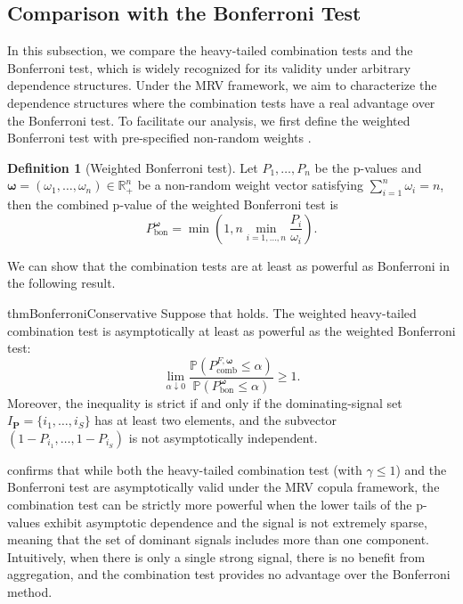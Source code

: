 \documentclass[12pt]{article}
\theoremstyle{plain}
\theoremstyle{plain}
\theoremstyle{definition}
\newtheorem{defn}{Definition}[section]
\renewcommand{\Pr}{\mathbb{P}}
\begin{document}
\subsection{Comparison with the Bonferroni Test}
\label{subsec:comp-with-bonferroni}
In this subsection, we compare the heavy-tailed combination tests
and the Bonferroni test, which is widely recognized for its validity under arbitrary dependence structures. 
Under the MRV framework, we aim to characterize the dependence structures where the combination tests have a real advantage over the Bonferroni test.  
To facilitate our analysis, we first define the weighted Bonferroni test with pre-specified non-random weights \citep{genovese2006false}.
\begin{defn}[Weighted Bonferroni test]
\label{def:bonferroni-test}
Let $P_1,\dots,P_n$ be the p-values and $\bm{\omega}=\left(\omega_1,\dots,\omega_n\right) \in\mathbb{R}_+^n$ be a non-random weight vector satisfying $\sum_{i = 1}^n \omega_i = n$, then the combined p-value of the weighted Bonferroni test is
$$P_{\mathrm{bon}}^{\bm{\omega}} =\min \left(1, n\min_{i=1,\dots,n}\frac{P_i}{\omega_i}\right).$$
\end{defn}






We can show that the combination tests are at least as powerful as Bonferroni in the following result.
\begin{restatable}{thm}{BonferroniConservative}
\label{thm:bonferroni-more-conservative}
Suppose that  holds.
The weighted heavy-tailed combination test is asymptotically at least as powerful as the weighted Bonferroni test:
\begin{equation*}
\lim_{\alpha\downarrow0}\frac{\Pr\left(P_\mathrm{comb}^{F, \bm \omega}\leq \alpha\right)}{\Pr\left(P_{\mathrm{bon}}^{\bm{\omega}}\leq \alpha\right)}\ge1.
\end{equation*}
Moreover, the inequality is strict if and only if the dominating-signal set $I_{\mathbf P} = \{i_1,\dots, i_S\}$ has at least two elements, and
the subvector $(1-P_{i_1}, \dots, 1- P_{i_S})$ is not asymptotically independent. 
\end{restatable}

 confirms that while both the heavy-tailed combination test (with $\gamma \leq 1$) and the Bonferroni test are asymptotically valid under the MRV copula framework, the combination test can be strictly more powerful when the lower tails of the p-values exhibit asymptotic dependence and the signal is not extremely sparse, meaning that the set of dominant signals includes more than one component. %
Intuitively, when there is only a single strong signal, there is no benefit from aggregation, and the combination test provides no advantage over the Bonferroni method.
\end{document}
